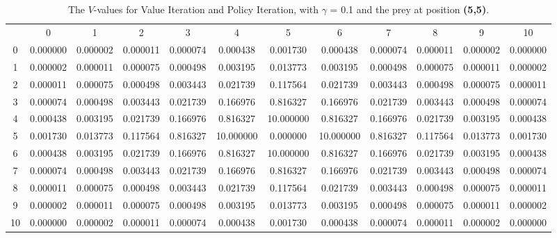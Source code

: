 \documentclass{article}
\begin{document}
\subsection*{}
\begin{table}[htbp]
\centering         
                \begin{footnotesize}  
					\begin{tabular} {c c c c c c c c c c c c}
					 & 0 & 1 & 2 & 3 & 4 & 5 & 6 & 7 & 8 & 9 & 10 \\
					0 & 0.000000 & 0.000002 & 0.000011 & 0.000074 & 0.000438 & 0.001730 & 0.000438 & 0.000074 & 0.000011 & 0.000002 & 0.000000\\
					1 & 0.000002 & 0.000011 & 0.000075 & 0.000498 & 0.003195 & 0.013773 & 0.003195 & 0.000498 & 0.000075 & 0.000011 & 0.000002\\
					2& 0.000011 & 0.000075 & 0.000498 & 0.003443 & 0.021739 & 0.117564 & 0.021739 & 0.003443 & 0.000498 & 0.000075 & 0.000011\\
					3 & 0.000074 & 0.000498 & 0.003443 & 0.021739 & 0.166976 & 0.816327 & 0.166976 & 0.021739 & 0.003443 & 0.000498 & 0.000074\\
					4 & 0.000438 & 0.003195 & 0.021739 & 0.166976 & 0.816327 & 10.000000 & 0.816327 & 0.166976 & 0.021739 & 0.003195 & 0.000438\\
					5 & 0.001730 & 0.013773 & 0.117564 & 0.816327 & 10.000000 & 0.000000 & 10.000000 & 0.816327 & 0.117564 & 0.013773 & 0.001730\\
					6 & 0.000438 & 0.003195 & 0.021739 & 0.166976 & 0.816327 & 10.000000 & 0.816327 & 0.166976 & 0.021739 & 0.003195 & 0.000438\\
					7 & 0.000074 & 0.000498 & 0.003443 & 0.021739 & 0.166976 & 0.816327 & 0.166976 & 0.021739 & 0.003443 & 0.000498 & 0.000074\\
					8 & 0.000011 & 0.000075 & 0.000498 & 0.003443 & 0.021739 & 0.117564 & 0.021739 & 0.003443 & 0.000498 & 0.000075 & 0.000011\\
					9 & 0.000002 & 0.000011 & 0.000075 & 0.000498 & 0.003195 & 0.013773 & 0.003195 & 0.000498 & 0.000075 & 0.000011 & 0.000002\\
					10 & 0.000000 & 0.000002 & 0.000011 & 0.000074 & 0.000438 & 0.001730 & 0.000438 & 0.000074 & 0.000011 & 0.000002 & 0.000000\\
					\end{tabular}	
					 \end{footnotesize}				
\caption{The $V$-values for Value Iteration and Policy Iteration, with $\gamma$ = 0.1 and the prey at position \textbf{(5,5)}.}
\label{valueiterationone}
\end{table}
\end{document}
